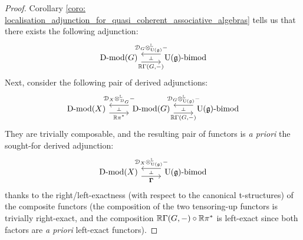                 \begin{proof}
                    Corollary \ref{coro: localisation_adjunction_for_quasi_coherent_associative_algebras} tells us that there exists the following adjunction:
                        $$
                            \begin{tikzcd}
                            	{\Dmod(G)} & {\U(\g)\bimod}
                            	\arrow[""{name=0, anchor=center, inner sep=0}, "{\R\Gamma(G, -)}"', shift right=2, from=1-1, to=1-2]
                            	\arrow[""{name=1, anchor=center, inner sep=0}, "{\D_G \tensor^{\L}_{\U(\g)} -}"', shift right=2, from=1-2, to=1-1]
                            	\arrow["\dashv"{anchor=center, rotate=-90}, draw=none, from=1, to=0]
                            \end{tikzcd}
                        $$
                    Next, consider the following pair of derived adjunctions:
                        $$
                            \begin{tikzcd}
                            	{\Dmod(X)} & {\Dmod(G)} & {\U(\g)\bimod}
                            	\arrow[""{name=0, anchor=center, inner sep=0}, "{\R\pi^*}"', shift right=2, from=1-1, to=1-2]
                            	\arrow[""{name=1, anchor=center, inner sep=0}, "{\D_X \tensor^{\L}_{\D_G} -}"', shift right=2, from=1-2, to=1-1]
                            	\arrow[""{name=2, anchor=center, inner sep=0}, "{\R\Gamma(G, -)}"', shift right=2, from=1-2, to=1-3]
                            	\arrow[""{name=3, anchor=center, inner sep=0}, "{\D_G \tensor^{\L}_{\U(\g)} -}"', shift right=2, from=1-3, to=1-2]
                            	\arrow["\dashv"{anchor=center, rotate=-90}, draw=none, from=1, to=0]
                            	\arrow["\dashv"{anchor=center, rotate=-90}, draw=none, from=3, to=2]
                            \end{tikzcd}
                        $$
                    They are trivially composable, and the resulting pair of functors is \textit{a priori} the sought-for derived adjunction:
                        $$
                            \begin{tikzcd}
                            	{\Dmod(X)} & {\U(\g)\bimod}
                            	\arrow[""{name=0, anchor=center, inner sep=0}, "{\bfGamma}"', shift right=2, from=1-1, to=1-2]
                            	\arrow[""{name=1, anchor=center, inner sep=0}, "{\D_X \tensor^{\L}_{\U(\g)} -}"', shift right=2, from=1-2, to=1-1]
                            	\arrow["\dashv"{anchor=center, rotate=-90}, draw=none, from=1, to=0]
                            \end{tikzcd}
                        $$   
                    thanks to the right/left-exactness (with respect to the canonical t-structures) of the composite functors (the composition of the two tensoring-up functors is trivially right-exact, and the composition $\mathbb{R}\Gamma(G, -) \circ \mathbb{R}\pi^*$ is left-exact since both factors are \textit{a priori} left-exact functors).  
                \end{proof}
